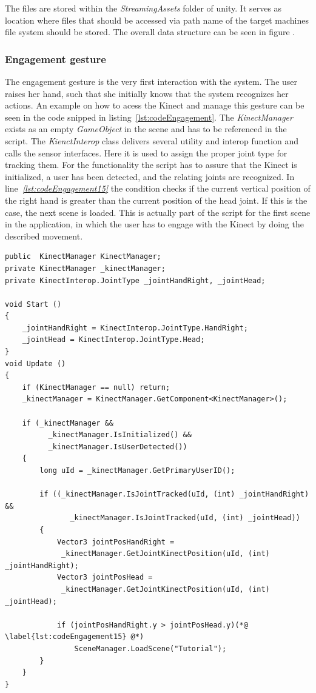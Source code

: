
The files are stored within the \textit{StreamingAssets} folder of unity. It serves as location where files that should be accessed via path name of the target machines file system should be stored. The overall data structure can be seen in figure .


\subsubsection{Engagement gesture}
The engagement gesture is the very first interaction with the system. The user raises her hand, such that she initially knows that the system recognizes her actions. An example on how to acess the Kinect and manage this gesture can be seen in the code snipped in listing~\ref{lst:codeEngagement}. The \textit{KinectManager} exists as an empty \textit{GameObject} in the scene and has to be referenced in the script. The \textit{KienctInterop} class delivers several utility and interop function and calls the sensor interfaces. Here it is used to assign the proper joint type for tracking them. For the functionality the script has to assure that the Kinect is initialized, a user has been detected, and the relating joints are recognized. In line\textit{~\ref{lst:codeEngagement15}} the condition checks if the current vertical position of the right hand is greater than the current position of the head joint. If this is the case, the next scene is loaded. This is actually part of the script for the first scene in the application, in which the user has to engage with the Kinect by doing the described movement.

\begin{lstlisting}[caption=C$^\sharp$ example code for tracking a raising hand, label=lst:codeEngagement]
public  KinectManager KinectManager;
private KinectManager _kinectManager;
private KinectInterop.JointType _jointHandRight, _jointHead;

void Start ()
{
	_jointHandRight = KinectInterop.JointType.HandRight;
	_jointHead = KinectInterop.JointType.Head;
}
void Update ()
{
	if (KinectManager == null) return;
	_kinectManager = KinectManager.GetComponent<KinectManager>();

	if (_kinectManager && 
		  _kinectManager.IsInitialized() && 
		  _kinectManager.IsUserDetected())
	{
		long uId = _kinectManager.GetPrimaryUserID();

		if ((_kinectManager.IsJointTracked(uId, (int) _jointHandRight) && 
			   _kinectManager.IsJointTracked(uId, (int) _jointHead))
		{
			Vector3 jointPosHandRight = 
			 _kinectManager.GetJointKinectPosition(uId, (int) _jointHandRight);
			Vector3 jointPosHead = 
			 _kinectManager.GetJointKinectPosition(uId, (int) _jointHead);			

			if (jointPosHandRight.y > jointPosHead.y)(*@ \label{lst:codeEngagement15} @*)
				SceneManager.LoadScene("Tutorial");
		}
	}
}
\end{lstlisting}
